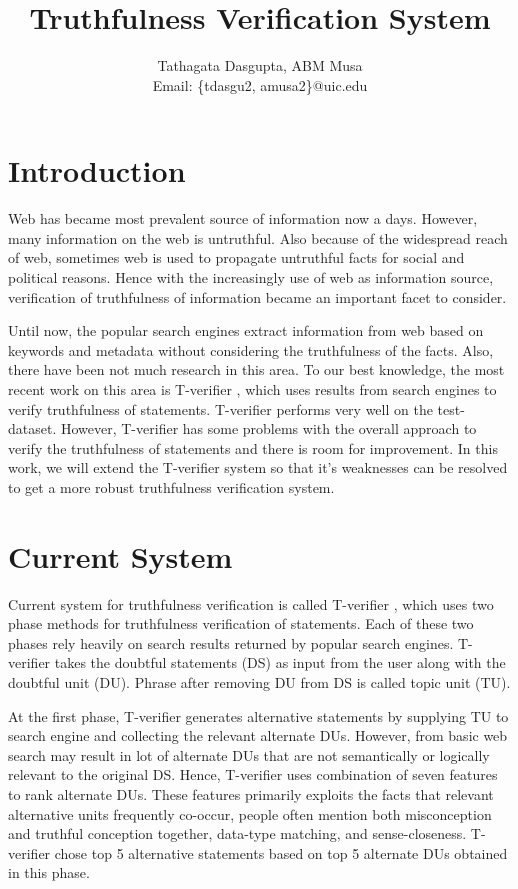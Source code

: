 \documentclass[11pt]{article}
\begin{document}
\title{Truthfulness Verification System}

\author{
Tathagata Dasgupta, ABM Musa\\
Email: \{tdasgu2, amusa2\}@uic.edu
}

\date{}
\maketitle


\section{Introduction}
Web has became most prevalent source of information now a days. However, many information on the web is untruthful. Also because of the widespread reach of web, sometimes web is used to propagate untruthful facts for social and political reasons. Hence with the increasingly use of web as information source, verification of truthfulness of information became an important facet to consider. 

Until now, the popular search engines extract information from web based on keywords and metadata without considering the truthfulness of the facts. Also, there have been not much research in this area. To our best knowledge, the most recent work on this area is T-verifier  \cite{tverifier}, which uses results from search engines to verify truthfulness of statements. T-verifier performs very well on the test-dataset. However, T-verifier has some problems with the overall approach to verify the truthfulness of statements and there is room for improvement. In this work, we will extend the T-verifier system so that it's weaknesses can be resolved to get a more robust truthfulness verification system. 


\section{Current System}
Current system for truthfulness verification is called T-verifier \cite{tverifier}, which uses two phase methods for truthfulness verification of statements. Each of these two phases rely heavily on search results returned by popular search engines. T-verifier takes the doubtful statements (DS) as input from the user along with the doubtful unit (DU). Phrase after removing DU from DS is called topic unit (TU).

At the first phase, T-verifier generates alternative statements by supplying TU to search engine and collecting the relevant alternate DUs. However, from basic web search may result in lot of alternate DUs that are not semantically or logically relevant to the original DS. Hence, T-verifier uses combination of seven features to rank alternate DUs. These features primarily exploits the facts that relevant alternative units frequently co-occur, people often mention both misconception and truthful conception together, data-type matching, and sense-closeness. T-verifier chose top 5 alternative statements based on top 5 alternate DUs obtained in this phase. 
\end{document}

